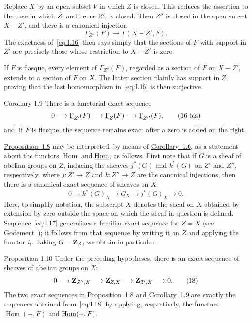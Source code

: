\begin{sgaproof}
Replace $X$ by an open subset $V$ in which $Z$ is closed.  This reduces
the assertion to the case in which $Z$, and hence $Z'$, is closed.
Then $Z''$ is closed in the open subset $X-Z'$, and there is a canonical
injection
\[
  \Gamma_{Z''}(F)\longrightarrow\Gamma(X-Z',F).
\]
The exactness of~\eqref{eq:I.16} then says simply that the sections of
$F$ with support in $Z'$ are precisely those whose restriction to
$X-Z'$ is zero.

If $F$ is flasque, every element of $\Gamma_{Z''}(F)$, regarded as a
section of $F$ on $X-Z'$, extends to a section of $F$ on $X$.  The
latter section plainly has support in $Z$, proving that the last
homomorphism in~\eqref{eq:I.16} is then surjective.
\end{sgaproof}

\begin{sgastatement}{Corollary 1.9}
There is a functorial exact sequence
\begin{equation}
  0\longrightarrow\mathop{\underline{\Gamma}}\nolimits_{Z'}(F)
  \longrightarrow\mathop{\underline{\Gamma}}\nolimits_Z(F)
  \longrightarrow\mathop{\underline{\Gamma}}\nolimits_{Z''}(F),
  \tag{16 bis}\label{eq:I.16bis}
\end{equation}
and, if $F$ is flasque, the sequence remains exact after a zero is added
on the right.
\end{sgastatement}

\hyperref[I.1.8]{Proposition~1.8} may be interpreted, by means of \hyperref[I.1.6]{Corollary~1.6}, as a
statement about the functors $\operatorname{Hom}$ and $\mathop{\underline{\mathrm{Hom}}}\nolimits$, as
follows.  First note that if $G$ is a sheaf of abelian groups on $Z$,
inducing the sheaves $j^*(G)$ and $k^*(G)$ on $Z'$ and $Z''$,
respectively, where $j:Z'\to Z$ and $k:Z''\to Z$ are the canonical
injections, then there is a canonical exact sequence of sheaves on $X$:
\begin{equation}
  0\longrightarrow k^*(G)_X
  \longrightarrow G_X
  \longrightarrow j^*(G)_X
  \longrightarrow 0.
  \tag{17}\label{eq:I.17}
\end{equation}
Here, to simplify notation, the subscript $X$ denotes the sheaf on $X$
obtained by extension by zero outside the space on which the sheaf in
question is defined.  Sequence~\eqref{eq:I.17} generalizes a familiar
exact sequence for $Z=X$ (see Godement~\cite{Godement}); it follows from
that sequence by writing it on $Z$ and applying the functor $i_!$.
Taking $G=\mathbf Z_Z$, we obtain in particular:

\begin{sgastatement}{Proposition 1.10}
Under the preceding hypotheses, there is an exact sequence of sheaves of
abelian groups on $X$:
\begin{equation}
  0\longrightarrow\mathbf Z_{Z'',X}
  \longrightarrow\mathbf Z_{Z,X}
  \longrightarrow\mathbf Z_{Z',X}
  \longrightarrow 0.
  \tag{18}\label{eq:I.18}
\end{equation}
The two exact sequences in \hyperref[I.1.8]{Proposition~1.8} and \hyperref[I.1.9]{Corollary~1.9} are exactly
the sequences obtained from~\eqref{eq:I.18} by applying, respectively,
the functors $\operatorname{Hom}(-,F)$ and $\mathop{\underline{\mathrm{Hom}}}\nolimits(-,F)$.
\end{sgastatement}


